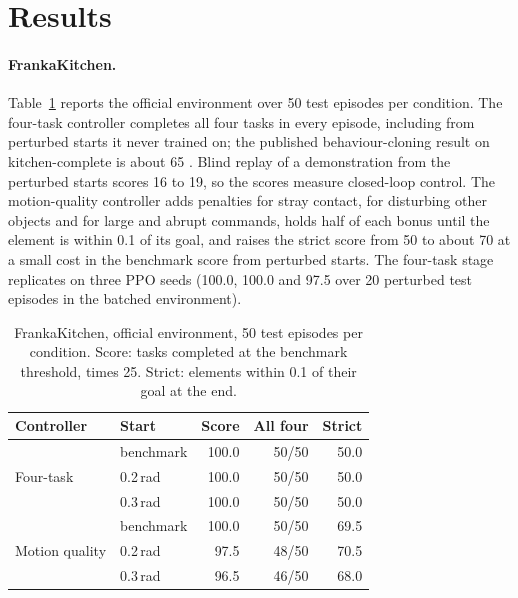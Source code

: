 \documentclass[10pt,twocolumn]{article}
\begin{document}
\section{Results}
\label{sec:results}

\paragraph{FrankaKitchen.}
Table~\ref{tab:kitchen} reports the official environment over 50 test episodes per condition.
The four-task controller completes all four tasks in every episode, including from perturbed starts it never trained on; the published behaviour-cloning result on kitchen-complete is about 65 \citep{fu2020d4rl}.
Blind replay of a demonstration from the perturbed starts scores 16 to 19, so the scores measure closed-loop control.
The motion-quality controller adds penalties for stray contact, for disturbing other objects and for large and abrupt commands, holds half of each bonus until the element is within 0.1 of its goal, and raises the strict score from 50 to about 70 at a small cost in the benchmark score from perturbed starts.
The four-task stage replicates on three PPO seeds (100.0, 100.0 and 97.5 over 20 perturbed test episodes in the batched environment).

\begin{table}[t]
\centering
\small
\caption{FrankaKitchen, official environment, 50 test episodes per condition. Score: tasks completed at the benchmark threshold, times 25. Strict: elements within 0.1 of their goal at the end.}
\label{tab:kitchen}
\begin{tabular}{@{}llrrr@{}}
\toprule
Controller & Start & Score & All four & Strict \\
\midrule
\multirow{3}{*}{Four-task} & benchmark & 100.0 & 50/50 & 50.0 \\
 & 0.2\,rad & 100.0 & 50/50 & 50.0 \\
 & 0.3\,rad & 100.0 & 50/50 & 50.0 \\
\midrule
\multirow{3}{*}{Motion quality} & benchmark & 100.0 & 50/50 & 69.5 \\
 & 0.2\,rad & 97.5 & 48/50 & 70.5 \\
 & 0.3\,rad & 96.5 & 46/50 & 68.0 \\
\bottomrule
\end{tabular}
\end{table}
\end{document}
